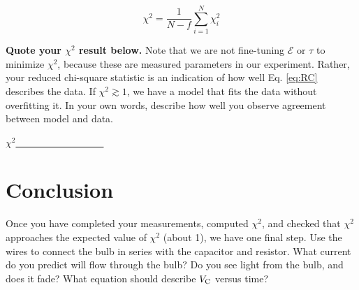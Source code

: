 \documentclass[12pt]{article}
\begin{document}
\begin{equation}
\chi^2 = \frac{1}{N-f}\sum_{i = 1}^N \chi_i^2 \label{eq:chi_sq_red}
\end{equation}

\textbf{Quote your $\chi^2$ result below.}  Note that we are not fine-tuning $\mathcal{E}$ or $\tau$ to minimize $\chi^2$, because these are measured parameters in our experiment.  Rather, your reduced chi-square statistic is an indication of how well Eq. \ref{eq:RC} describes the data.  If $\chi^2 \gtrsim 1$, we have a model that fits the data without overfitting it.  In your own words, describe how well you observe agreement between model and data.  \\ \vspace{1cm}

$\chi^2$\underline{~~~~~~~~~~~~~~~~~~}

\section{Conclusion}

Once you have completed your measurements, computed $\chi^2$, and checked that $\chi^2$ approaches the expected value of $\chi^2$ (about 1), we have one final step.  Use the wires to connect the bulb in series with the capacitor and resistor.  What current do you predict will flow through the bulb?  Do you see light from the bulb, and does it fade?  What equation should describe $V_{\rm C}$ versus time?
\end{document}
